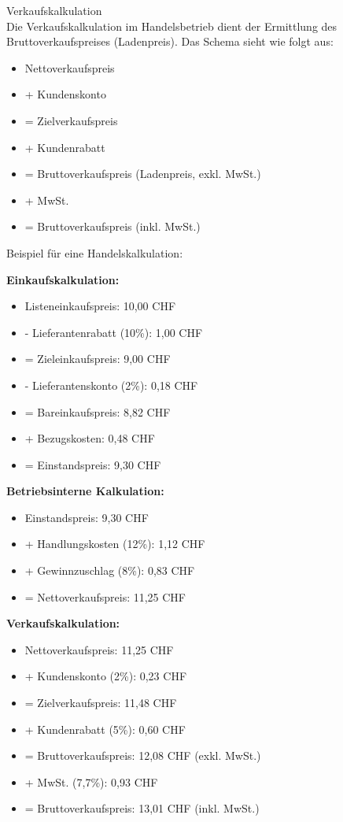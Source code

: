 \begin{definition}{Verkaufskalkulation}\\
Die Verkaufskalkulation im Handelsbetrieb dient der Ermittlung des Bruttoverkaufspreises (Ladenpreis). Das Schema sieht wie folgt aus:
\begin{itemize}
    \item Nettoverkaufspreis
    \item + Kundenskonto
    \item = Zielverkaufspreis
    \item + Kundenrabatt
    \item = Bruttoverkaufspreis (Ladenpreis, exkl. MwSt.)
    \item + MwSt.
    \item = Bruttoverkaufspreis (inkl. MwSt.)
\end{itemize}
\end{definition}

\begin{example}
Beispiel für eine Handelskalkulation:

\textbf{Einkaufskalkulation:}
\begin{itemize}
    \item Listeneinkaufspreis: 10,00 CHF
    \item - Lieferantenrabatt (10\%): 1,00 CHF
    \item = Zieleinkaufspreis: 9,00 CHF
    \item - Lieferantenskonto (2\%): 0,18 CHF
    \item = Bareinkaufspreis: 8,82 CHF
    \item + Bezugskosten: 0,48 CHF
    \item = Einstandspreis: 9,30 CHF
\end{itemize}

\textbf{Betriebsinterne Kalkulation:}
\begin{itemize}
    \item Einstandspreis: 9,30 CHF
    \item + Handlungskosten (12\%): 1,12 CHF
    \item + Gewinnzuschlag (8\%): 0,83 CHF
    \item = Nettoverkaufspreis: 11,25 CHF
\end{itemize}

\textbf{Verkaufskalkulation:}
\begin{itemize}
    \item Nettoverkaufspreis: 11,25 CHF
    \item + Kundenskonto (2\%): 0,23 CHF
    \item = Zielverkaufspreis: 11,48 CHF
    \item + Kundenrabatt (5\%): 0,60 CHF
    \item = Bruttoverkaufspreis: 12,08 CHF (exkl. MwSt.)
    \item + MwSt. (7,7\%): 0,93 CHF
    \item = Bruttoverkaufspreis: 13,01 CHF (inkl. MwSt.)
\end{itemize}
\end{example}

